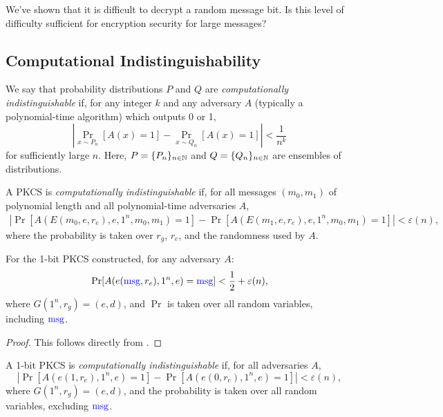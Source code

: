 \begin{exercise}
    We've shown that it is difficult to decrypt a random message bit.
    Is this level of difficulty sufficient for encryption security for large messages?
\end{exercise}

\subsection{Computational Indistinguishability}

\begin{definition}
	We say that probability distributions $P$ and $Q$ are \emph{computationally indistinguishable} if, for any integer $k$ and any adversary $A$ (typically a polynomial-time algorithm) which outputs 0 or 1,
	 \[
		 \left|\Pr_{x \sim P_n} [A(x) = 1] - \Pr_{x \sim Q_n} [A(x) = 1]\right| < \frac{1}{n^{k}}
	 \] 
	 for sufficiently large $n$.
	 Here, $P = \{P_n\}_{n \in \mathbb{N}} $ and $Q = \{Q_n\}_{n \in \mathbb{N}} $ are ensembles of distributions.
\end{definition}

\begin{definition}
	A PKCS is \emph{computationally indistinguishable} if, for all messages $(m_0, m_1)$ of polynomial length and all polynomial-time adversaries $A$,
	\begin{align*}
		\left|\Pr[A(E(m_0, e, r_e), e, 1^{n}, m_0, m_1) = 1] - \Pr[A(E(m_1, e, r_e), e, 1^{n}, m_0, m_1) = 1]\right| < \varepsilon(n),
	\end{align*}
	where the probability is taken over $r_g$, $r_e$, and the randomness used by $A$.
\end{definition}

\begin{theorem}
	For the 1-bit PKCS constructed, for any adversary $A$:
	 \[
		 \Pr[A(e(\textcolor{blue}{\text{msg}}, r_e), 1^{n}, e) = \textcolor{blue}{\text{msg}}] < \frac{1}{2} + \varepsilon(n),
	 \] 
	where $G(1^{n}, r_g) = (e, d)$, and $\Pr$ is taken over all random variables, including $\textcolor{blue}{\text{msg}}$.
\end{theorem}

\begin{proof}
	This follows directly from .
\end{proof}

\begin{definition}
	A 1-bit PKCS is \emph{computationally indistinguishable} if, for all adversaries $A$,
	 \[
		 \left|\Pr[A(e(1, r_e), 1^{n}, e) = 1] - \Pr[A(e(0, r_e), 1^{n}, e) = 1]\right| < \varepsilon(n),
	 \] 
	where $G(1^{n}, r_g) = (e, d)$, and the probability is taken over all random variables, excluding $\textcolor{blue}{\text{msg}}$.
\end{definition}

